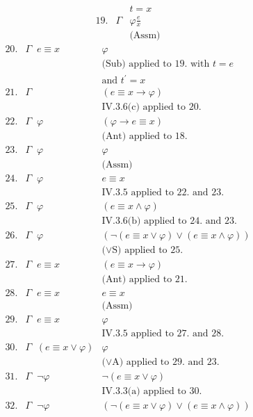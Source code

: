 \begin{enumerate}[1.]
\begin{enumerate}[(i)]
\begin{enumerate}
\[\begin{array}{lll}
\  & \      & \mbox{$t = x$} \\
19.& \Gamma & \varphi\frac{e}{x} \\
\  & \      & \mbox{(Assm)}
\end{array}
\]
\[
\begin{array}{lll}
20.& \Gamma \;\; e \equiv x & \varphi \\
\  & \      & \mbox{(Sub) applied to 19. with $t = e$} \\
\  & \      & \mbox{and $t^\prime = x$} \\
21.& \Gamma & (e \equiv x \rightarrow \varphi) \\
\  & \      & \mbox{IV.3.6(c) applied to 20.} \\
22. & \Gamma \;\; \varphi & (\varphi \rightarrow e \equiv x) \\
\  & \      & \mbox{(Ant) applied to 18.} \\
23. & \Gamma \;\; \varphi & \varphi \\
\  & \      & \mbox{(Assm)} \\
24. & \Gamma \;\; \varphi & e \equiv x \\
\  & \      & \mbox{IV.3.5 applied to 22. and 23.} \\
25. & \Gamma \;\; \varphi & (e \equiv x \land \varphi) \\
\  & \      & \mbox{IV.3.6(b) applied to 24. and 23.} \\
26. & \Gamma \;\; \varphi & (\neg (e \equiv x \lor \varphi) \lor (e \equiv x \land \varphi)) \\
\  & \      & \mbox{($\lor$S) applied to 25.} \\
27. & \Gamma \;\; e \equiv x & (e \equiv x \rightarrow \varphi) \\
\  & \      & \mbox{(Ant) applied to 21.} \\
28. & \Gamma \;\; e \equiv x & e \equiv x \\
\  & \      & \mbox{(Assm)} \\
29.& \Gamma \;\; e \equiv x & \varphi \\
\  & \      & \mbox{IV.3.5 applied to 27. and 28.} \\
30.& \Gamma \;\; (e \equiv x \lor \varphi) & \varphi \\
\  & \      & \mbox{($\lor$A) applied to 29. and 23.} \\
31.& \Gamma \;\; \neg \varphi & \neg (e \equiv x \lor \varphi) \\
\  & \      & \mbox{IV.3.3(a) applied to 30.} \\
32.& \Gamma \;\; \neg \varphi & (\neg (e \equiv x \lor \varphi) \lor (e \equiv x \land \varphi)) \\

\end{array}\]
\end{enumerate}
\end{enumerate}
\end{enumerate}
